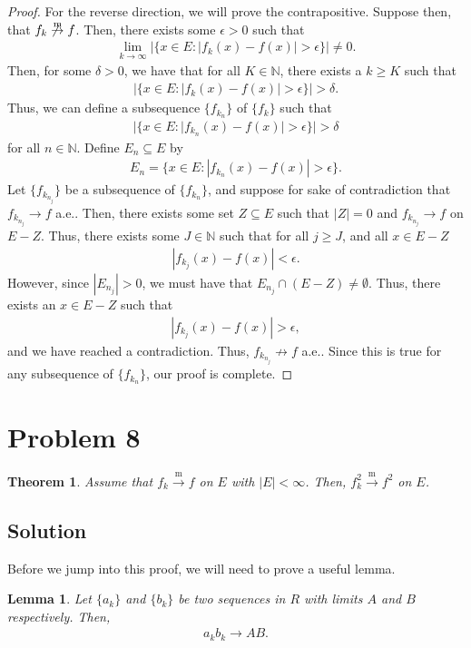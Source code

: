 \documentclass[10pt,a4paper]{article}
\theoremstyle{theorem}
\newtheorem{theorem}{Theorem}
\newtheorem{lemma}{Lemma}
\theoremstyle{definition}
\begin{document}
\begin{proof}
For the reverse direction, we will prove the contrapositive. Suppose then, that  $f_k \not \overset{\text{m}}{\to} f$. Then, there exists some $\epsilon > 0$ such that 
\begin{align*}
\lim_{k \to \infty} |\{x \in E: |f_k(x) - f(x)| > \epsilon \}| \not = 0.
\end{align*}
Then, for some $\delta > 0$, we have that for all $K \in \mathbb{N}$, there exists a $k \geq K$ such that 
\begin{align*}
|\{x \in E: |f_k(x) - f(x)| > \epsilon \}| > \delta.
\end{align*}
Thus, we can define a subsequence $\{f_{k_n}\}$ of $\{f_k\}$ such that 
\begin{align*}
|\{x \in E: |f_{k_n}(x) - f(x)| > \epsilon \}| > \delta
\end{align*}
for all $n \in \mathbb{N}$. Define $E_n \subseteq E$ by 
\begin{align*}
E_n = \{x \in E: |f_{k_n}(x) - f(x)| > \epsilon \}.
\end{align*}
Let $\{ f_{k_{n_j}} \}$ be a subsequence of $\{f_{k_n}\}$, and suppose for sake of contradiction that $f_{k_{n_j}} \to f$ a.e.. Then, there exists some set $Z \subseteq E$ such that $|Z| = 0$ and $f_{k_{n_j}} \to f$ on $E - Z$. Thus, there exists some $J \in \mathbb{N}$ such that for all $j \geq J$, and all $x \in E - Z$
\begin{align*}
|f_{k_j}(x) - f(x)| < \epsilon.
\end{align*}
However, since $|E_{n_j}| > 0$, we must have that $E_{n_j} \cap (E - Z) \not = \emptyset$. Thus, there exists an $x \in E - Z$ such that
\begin{align*}
|f_{k_j}(x) - f(x)| > \epsilon,
\end{align*}
and we have reached a contradiction. Thus, $f_{k_{n_j}} \not \to f$ a.e.. Since this is true for any subsequence of $\{f_{k_n}\}$, our proof is complete.
\end{proof}

\section*{Problem 8}
\begin{theorem}
Assume that $f_k \overset{\text{m}}{\to} f$ on $E$ with $|E| < \infty$. Then, $f^2_k \overset{\text{m}}{\to} f^2$ on $E$.
\end{theorem}

\subsection*{Solution}
Before we jump into this proof, we will need to prove a useful lemma.
\begin{lemma}
Let $\{a_k\}$ and $\{b_k\}$ be two sequences in $R$ with limits $A$ and $B$ respectively. Then,
\begin{align*}
a_k b_k \to AB.
\end{align*}
\end{lemma}
\end{document}
